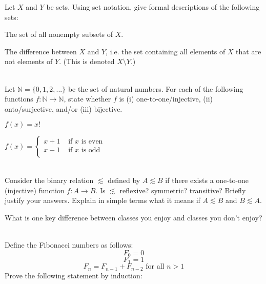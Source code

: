 \documentclass[solution, letterpaper]{cs121}
\begin{document}


Let $X$ and $Y$ be sets. Using set notation, give formal descriptions of the following sets:

\subproblem The set of all nonempty subsets of $X$.

\subproblem The difference between $X$ and $Y$, i.e. the set containing all elements of $X$ that are not elements of $Y$. (This is denoted $X \setminus Y$.)
\\\\
 

Let $\mathbb{N} = \{0, 1, 2, ... \}$ be the set of natural numbers. For each of the following functions $f : \mathbb{N} \to \mathbb{N}$, state whether $f$ is (i) one-to-one/injective, (ii) onto/surjective, and/or (iii) bijective.

\subproblem $f(x) = x!$

\subproblem $f(x) = \begin{cases} 
      x + 1 & \text{ if } x \text{ is even } \\
      x - 1 & \text{ if } x \text{ is odd } \\
   \end{cases}$
\\\\


Consider the binary relation $\lesssim$ defined by $A \lesssim B$ if there exists a one-to-one (injective) function $f : A \to B$. Is $\lesssim$ reflexive? symmetric? transitive? Briefly justify your answers. Explain in simple terms what it means if $A \lesssim B$ and $B \lesssim A$.


 
What is one key difference between classes you enjoy and classes you don't enjoy?
\\\\


Define the Fibonacci numbers as follows:
\[ F_0 = 0 \]
\[ F_1 = 1 \]
\[F_n = F_{n-1} + F_{n-2} \text{ for all } n > 1\]
Prove the following statement by induction:
\end{document}
